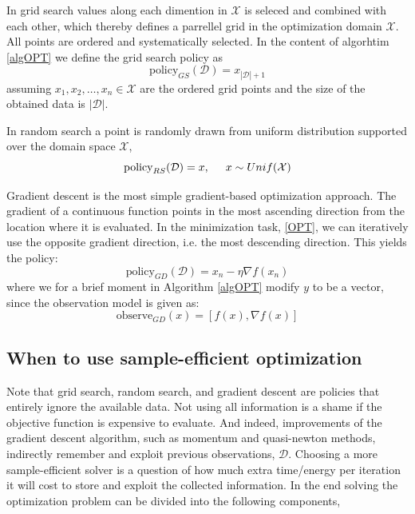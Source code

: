 \begin{testexample}
    In grid search values along each dimention in $\mathcal{X}$ is seleced and combined with each
    other, which thereby defines a parrellel grid in the optimization domain $\mathcal{X}$. All
    points are ordered and systematically selected. In the content of algorhtim \ref{algOPT} we define
    the grid search policy as 
    $$\text{policy}_{GS}(\mathcal{D}) = x_{|\mathcal{D}|+1}$$
    assuming $x_1,x_2, \dots, x_{n} \in \mathcal{X}$ are the ordered grid points and the size of the obtained 
    data is $|\mathcal{D}|$.
\end{testexample}
\begin{testexample}
    In random search a point is randomly drawn from uniform distribution supported over the domain
    space $\mathcal{X}$, 
    $$\text{policy}_{RS}(\mathcal{D}) = x, \hspace{0.5cm} x \sim Unif(\mathcal{X})$$
\end{testexample}
\begin{testexample}
    Gradient descent is the most simple gradient-based optimization approach. The gradient of a
    continuous function points in the most ascending direction from the location where it is
    evaluated. In the minimization task, \eqref{OPT}, we can iteratively use the opposite gradient
    direction, i.e. the most descending direction. This yields the policy:
    $$\text{policy}_{GD}(\mathcal{D}) = x_n - \eta \nabla f(x_n)$$
    where we for a brief moment in Algorithm \eqref{algOPT} modify $y$ to be a vector, since the observation model 
    is given as:
    $$\text{observe}_{GD}(x) = [f(x), \nabla f(x)]$$
\end{testexample}

\subsection{When to use sample-efficient optimization}
Note that grid search, random search, and gradient descent are policies that entirely ignore the
available data. Not using all information is a shame if the objective function is expensive to
evaluate. And indeed, improvements of the gradient descent algorithm, such as momentum and
quasi-newton methods, indirectly remember and exploit previous observations, $\mathcal{D}$. Choosing a
more sample-efficient solver is a question of how much extra time/energy per iteration it will cost to
store and exploit the collected information. In the end solving the optimization problem can be divided
into the following components, 


